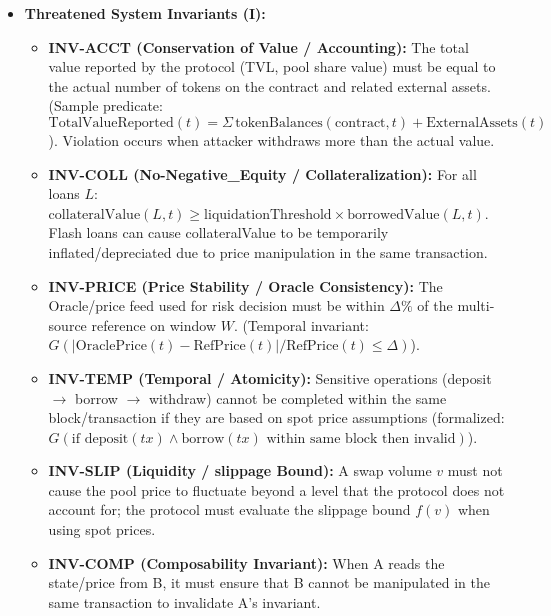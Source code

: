 \begin{itemize}
    \item \textbf{Threatened System Invariants (I):}
    \begin{itemize}
        \item \textbf{INV-ACCT (Conservation of Value / Accounting):} The total value reported by the protocol (TVL, pool share value) must be equal to the actual number of tokens on the contract and related external assets. (Sample predicate: $\mathrm{TotalValueReported}(t) = \Sigma\, \mathrm{tokenBalances}(\mathrm{contract}, t) + \mathrm{ExternalAssets}(t)$). Violation occurs when attacker withdraws more than the actual value.
        \item \textbf{INV-COLL (No-Negative\_Equity / Collateralization):} For all loans $L$: $\mathrm{collateralValue}(L,t) \geq \mathrm{liquidationThreshold} \times \mathrm{borrowedValue}(L,t)$. Flash loans can cause collateralValue to be temporarily inflated/depreciated due to price manipulation in the same transaction.
        \item \textbf{INV-PRICE (Price Stability / Oracle Consistency):} The Oracle/price feed used for risk decision must be within $\Delta\%$ of the multi-source reference on window $W$. (Temporal invariant: $G(|\mathrm{OraclePrice}(t) - \mathrm{RefPrice}(t)|/\mathrm{RefPrice}(t) \leq \Delta)$).
        \item \textbf{INV-TEMP (Temporal / Atomicity):} Sensitive operations (deposit $\rightarrow$ borrow $\rightarrow$ withdraw) cannot be completed within the same block/transaction if they are based on spot price assumptions (formalized: $G(\text{if deposit}(tx) \wedge \text{borrow}(tx) \text{ within same block then invalid})$).
        \item \textbf{INV-SLIP (Liquidity / slippage Bound):} A swap volume $v$ must not cause the pool price to fluctuate beyond a level that the protocol does not account for; the protocol must evaluate the slippage bound $f(v)$ when using spot prices.
        \item \textbf{INV-COMP (Composability Invariant):} When A reads the state/price from B, it must ensure that B cannot be manipulated in the same transaction to invalidate A's invariant.
    \end{itemize}


\end{itemize}

